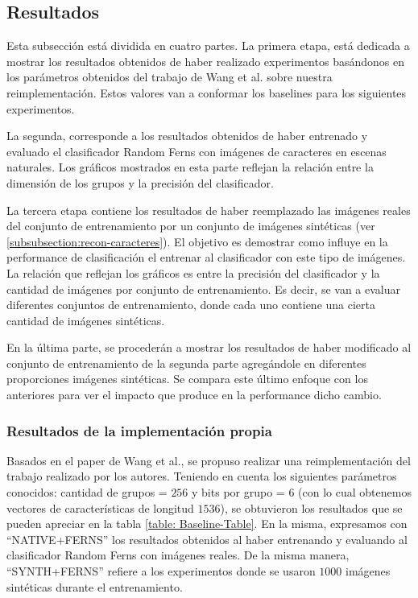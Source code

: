 \newpage
\subsection{Resultados}

\label{subsection:resultados}

	Esta subsección está dividida en cuatro partes. La primera etapa, está dedicada a mostrar los resultados obtenidos de haber realizado experimentos basándonos en los parámetros obtenidos del trabajo de Wang et al. sobre nuestra reimplementación. Estos valores van a conformar los baselines para los siguientes experimentos. 
	
	La segunda, corresponde a los resultados obtenidos de haber entrenado y evaluado el clasificador Random Ferns con imágenes de caracteres en escenas naturales. Los gráficos mostrados en esta parte reflejan la relación entre la dimensión de los grupos y la precisión del clasificador.
	
	La tercera etapa contiene los resultados de haber reemplazado las imágenes reales del conjunto de entrenamiento por un conjunto de imágenes sintéticas (ver \ref{subsubsection:recon-caracteres}). El objetivo es demostrar como influye en la performance de clasificación el entrenar al clasificador con este tipo de imágenes. La relación que reflejan los gráficos es entre la precisión del clasificador y la cantidad de imágenes por conjunto de entrenamiento. Es decir, se van a evaluar diferentes conjuntos de entrenamiento, donde cada uno contiene una cierta cantidad de imágenes sintéticas. 
	
	En la última parte, se procederán a mostrar los resultados de haber modificado al conjunto de entrenamiento de la segunda parte agregándole en diferentes proporciones imágenes sintéticas. Se compara este último enfoque con los anteriores para ver el impacto que produce en la performance dicho cambio.
	
	\subsubsection{Resultados de la implementación propia}
	\label{subsubsection: baseline-propio}
	
	Basados en el paper de Wang et al., se propuso realizar una reimplementación del trabajo realizado por los autores. Teniendo en cuenta los siguientes parámetros conocidos: cantidad de grupos = $256$ y bits por grupo = $6$ (con lo cual obtenemos vectores de características de longitud $1536$), se obtuvieron los resultados que se pueden apreciar en la tabla \ref{table: Baseline-Table}. En la misma, expresamos con ``NATIVE+FERNS'' los resultados obtenidos al haber entrenando y evaluando al clasificador Random Ferns con imágenes reales. De la misma manera, ``SYNTH+FERNS'' refiere a los experimentos donde se usaron $1000$ imágenes sintéticas durante el entrenamiento.
	
